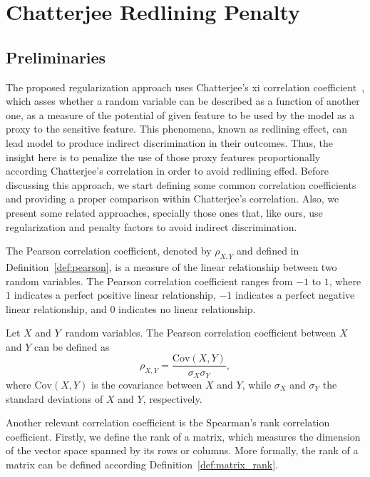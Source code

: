 \chapter{Chatterjee Redlining Penalty}

\section{Preliminaries}

The proposed regularization approach uses Chatterjee's xi correlation coefficient~\cite{}, which asses whether a random variable can be described as a function of another one, as a measure of the potential of given feature to be used by the model as a proxy to the sensitive feature. This phenomena, known as redlining effect, can lead model to produce indirect discrimination in their outcomes. Thus, the insight here is to penalize the use of those proxy features proportionally according Chatterjee's correlation in order to avoid redlining effed. Before discussing this approach, we start defining some common correlation coefficients and providing a proper comparison within Chatterjee's correlation. Also, we present some related approaches, specially those ones that, like ours, use regularization and penalty factors to avoid indirect discrimination.

The Pearson correlation coefficient, denoted by $\rho_{X,Y}$ and defined in Definition~\ref{def:pearson}, is a measure of the linear relationship between two random variables. The Pearson correlation coefficient ranges from $-1$ to $1$, where $1$ indicates a perfect positive linear relationship, $-1$ indicates a perfect negative linear relationship, and $0$ indicates no linear relationship.

\begin{definition}\label{def:pearson}
Let  $X$ and $Y$\ random variables. The Pearson correlation coefficient between $X$ and $Y$ can be defined as  
\begin{equation}
\rho_{X,Y} = \frac{\mathrm{Cov}(X, Y)}{\sigma_X \sigma_Y},
\end{equation}
where $\mathrm{Cov}(X, Y)$ is the covariance between $X$ and $Y$, while $\sigma_X$ and $\sigma_Y$ the standard deviations of $X$ and $Y$, respectively. 
\end{definition}

Another relevant correlation coefficient is the Spearman's rank correlation coefficient. Firstly, we define the rank of a matrix, which measures the dimension of the vector space spanned by its rows or columns. More formally, the rank of a matrix can be defined according Definition~\ref{def:matrix_rank}.

